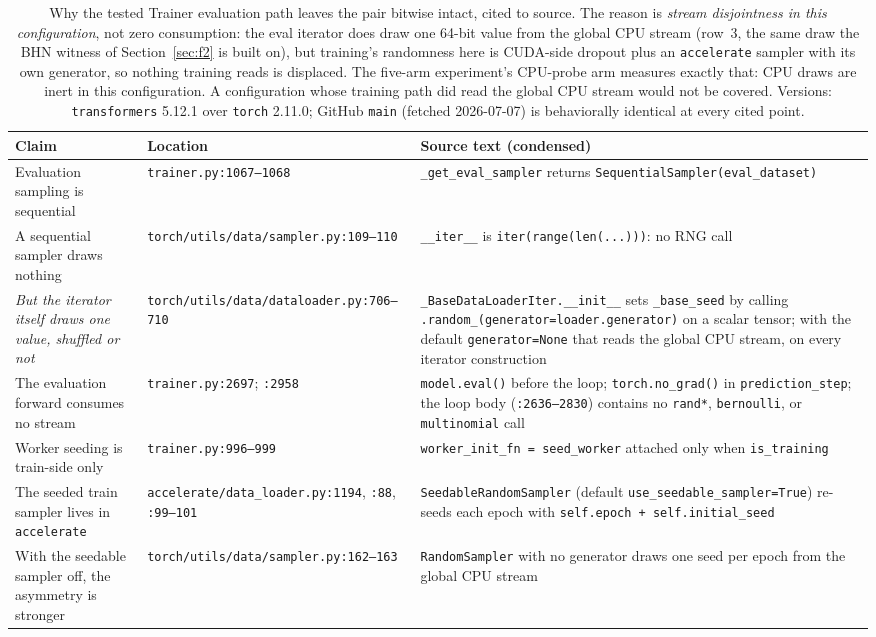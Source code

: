 \documentclass[10pt,letterpaper]{article}
\theoremstyle{remark}
\newcommand{\code}[1]{\texttt{#1}}
\begin{document}
\begin{table}[tbp]
\centering
\footnotesize
\setlength{\tabcolsep}{5pt}
\begin{tabular}{@{}L{4.6cm}L{4.4cm}L{6.3cm}@{}}
\toprule
Claim & Location & Source text (condensed) \\
\midrule
Evaluation sampling is sequential & \code{trainer.py:1067--1068} &
\code{\_get\_eval\_sampler} returns
\code{SequentialSampler(eval\_dataset)} \\
A sequential sampler draws nothing &
\code{torch/utils/data/}\allowbreak\code{sampler.py:109--110} &
\code{\_\_iter\_\_} is \code{iter(range(len(...)))}: no RNG call \\
\emph{But the iterator itself draws one value, shuffled or not} &
\code{torch/utils/data/}\allowbreak\code{dataloader.py:706--710} &
\code{\_BaseDataLoaderIter.\_\_init\_\_} sets
\code{\_base\_seed} by calling
\code{.random\_(}\allowbreak\code{generator=}\allowbreak\code{loader.generator)}
on a scalar tensor; with the default \code{generator=None} that reads the
global CPU stream, on every iterator construction \\
The evaluation forward consumes no stream & \code{trainer.py:2697};
\code{:2958} & \code{model.eval()} before the loop;
\code{torch.no\_grad()} in \code{prediction\_step}; the loop body
(\code{:2636--2830}) contains no \code{rand*}, \code{bernoulli}, or
\code{multinomial} call \\
Worker seeding is train-side only & \code{trainer.py:996--999} &
\code{worker\_init\_fn = seed\_worker} attached only when
\code{is\_training} \\
The seeded train sampler lives in \code{accelerate} &
\code{accelerate/}\allowbreak\code{data\_loader.py:1194}, \code{:88}, \code{:99--101} &
\code{SeedableRandomSampler} (default \code{use\_seedable\_sampler=True})
re-seeds each epoch with \code{self.epoch + self.initial\_seed} \\
With the seedable sampler off, the asymmetry is stronger &
\code{torch/utils/data/}\allowbreak\code{sampler.py:162--163} & \code{RandomSampler} with no
generator draws one seed per epoch from the global CPU stream \\
\bottomrule
\end{tabular}
\caption{Why the tested Trainer evaluation path leaves the pair bitwise
intact, cited to source. The reason is \emph{stream disjointness in this
configuration}, not zero consumption: the eval iterator does draw one
64-bit value from the global CPU stream (row~3, the same draw the BHN
witness of Section~\ref{sec:f2} is built on), but training's randomness
here is CUDA-side dropout plus an \code{accelerate} sampler with its own
generator, so nothing training reads is displaced. The five-arm
experiment's CPU-probe arm measures exactly that: CPU draws are inert in
this configuration. A configuration whose training path did read the
global CPU stream would not be covered. Versions: \code{transformers} 5.12.1 over
\code{torch} 2.11.0; GitHub \code{main} (fetched 2026-07-07) is
behaviorally identical at every cited point.}
\label{tab:hf}
\end{table}
\end{document}
